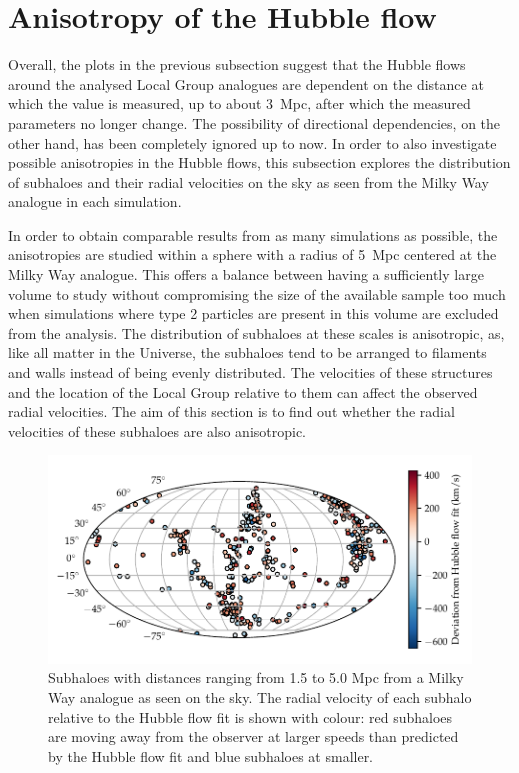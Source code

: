 \documentclass[english, oneside]{HYgradu}
\begin{document}
\section{Anisotropy of the Hubble flow}
Overall, the plots in the previous subsection suggest that the Hubble flows around the analysed Local Group analogues are dependent on the distance at which the value is measured, up to about 3~Mpc, after which the measured parameters no longer change. The possibility of directional dependencies, on the other hand, has been completely ignored up to now. In order to also investigate possible anisotropies in the Hubble flows, this subsection explores the distribution of subhaloes and their radial velocities on the sky as seen from the Milky Way analogue in each simulation.

In order to obtain comparable results from as many simulations as possible, the anisotropies are studied within a sphere with a radius of 5~Mpc centered at the Milky Way analogue. This offers a balance between having a sufficiently large volume to study without compromising the size of the available sample too much when simulations where type 2 particles are present in this volume are excluded from the analysis. The distribution of subhaloes at these scales is anisotropic, as, like all matter in the Universe, the subhaloes tend to be arranged to filaments and walls instead of being evenly distributed. The velocities of these structures and the location of the Local Group relative to them can affect the observed radial velocities. The aim of this section is to find out whether the radial velocities of these subhaloes are also anisotropic. %

\begin{figure}
    \centering
    \includegraphics{kuvat/mollweide-anisotropy.pdf}
    \caption{Subhaloes with distances ranging from 1.5 to 5.0 Mpc from a Milky Way analogue as seen on the sky. The radial velocity of each subhalo relative to the Hubble flow fit is shown with colour: red subhaloes are moving away from the observer at larger speeds than predicted by the Hubble flow fit and blue subhaloes at smaller.}\label{fig:mollweide-anisotropy}
\end{figure}
\end{document}
